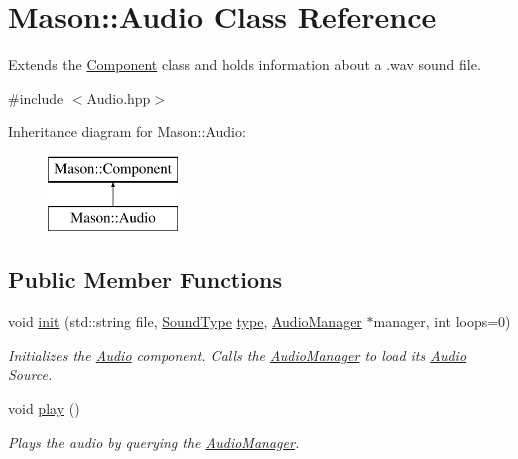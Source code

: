 \hypertarget{class_mason_1_1_audio}{}\section{Mason\+:\+:Audio Class Reference}
\label{class_mason_1_1_audio}


Extends the \hyperlink{class_mason_1_1_component}{Component} class and holds information about a .wav sound file.  




{\ttfamily \#include $<$Audio.\+hpp$>$}

Inheritance diagram for Mason\+:\+:Audio\+:\begin{figure}[H]
\begin{center}
\leavevmode
\includegraphics[height=2.000000cm]{class_mason_1_1_audio}
\end{center}
\end{figure}
\subsection*{Public Member Functions}
\begin{DoxyCompactItemize}
\item 
void \hyperlink{class_mason_1_1_audio_a5d4f318f5bee0b59d1a4289495b01b4c}{init} (std\+::string file, \hyperlink{namespace_mason_a158d651086d1ba1aacc4c37125b27657}{Sound\+Type} \hyperlink{class_mason_1_1_audio_a100d9da58685f865bf03dcf44a55fb63}{type}, \hyperlink{class_mason_1_1_audio_manager}{Audio\+Manager} $\ast$manager, int loops=0)
\begin{DoxyCompactList}\small\item\em Initializes the \hyperlink{class_mason_1_1_audio}{Audio} component. Calls the \hyperlink{class_mason_1_1_audio_manager}{Audio\+Manager} to load its \hyperlink{class_mason_1_1_audio}{Audio} Source. \end{DoxyCompactList}\item 
void \hyperlink{class_mason_1_1_audio_a2916f9015031bee9abb98adf0d83e7ee}{play} ()
\begin{DoxyCompactList}\small\item\em Plays the audio by querying the \hyperlink{class_mason_1_1_audio_manager}{Audio\+Manager}. \end{DoxyCompactList}\end{DoxyCompactItemize}
